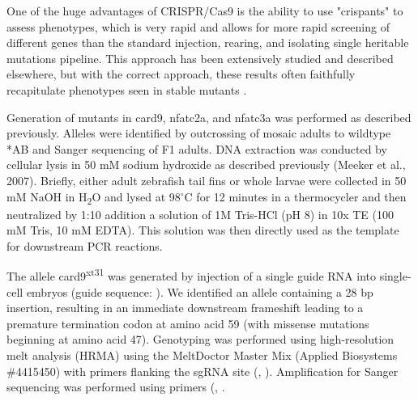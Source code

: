 One of the huge advantages of CRISPR/Cas9 is the ability to use "crispants" to assess phenotypes, which is very rapid and allows for more rapid screening of different genes than the standard injection, rearing, and isolating single heritable mutations pipeline. This approach has been extensively studied and described elsewhere, but with the correct approach, these results often faithfully recapitulate phenotypes seen in stable mutants \citep{Zhang2017}.

Generation of mutants in card9, nfatc2a, and nfatc3a was performed as described previously. Alleles were identified by outcrossing of mosaic adults to wildtype *AB and Sanger sequencing of F1 adults. DNA extraction was conducted by cellular lysis in 50 mM sodium hydroxide as described previously (Meeker et al., 2007). Briefly, either adult zebrafish tail fins or whole larvae were collected in 50 mM NaOH in H\textsubscript{2}O and lysed at 98$^{\circ}$C for 12 minutes in a thermocycler and then neutralized by 1:10 addition a solution of 1M Tris-HCl (pH 8) in 10x TE (100 mM Tris, 10 mM EDTA). This solution was then directly used as the template for downstream PCR reactions. 

The allele card9\textsuperscript{xt31} was generated by injection of a single guide RNA into single-cell embryos (guide sequence: ). We identified an allele containing a 28 bp insertion, resulting in an immediate downstream frameshift leading to a premature termination codon at amino acid 59 (with missense mutations beginning at amino acid 47). Genotyping was performed using high-resolution melt analysis (HRMA) using the MeltDoctor Master Mix  (Applied Biosystems \#4415450) with primers flanking the sgRNA site (, ). Amplification for Sanger sequencing was performed using primers (, .

